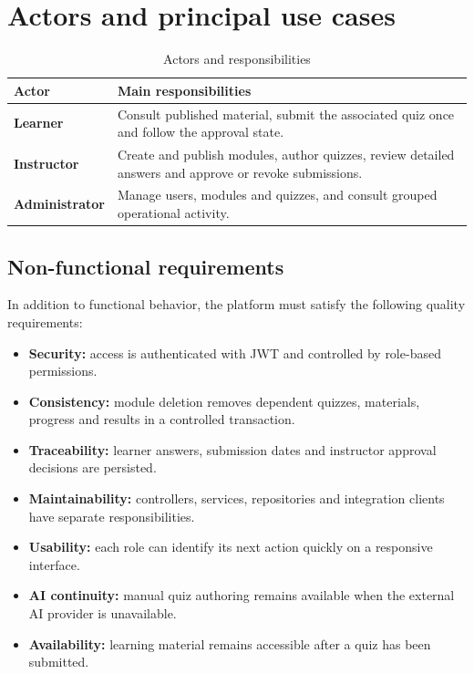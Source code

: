 \section{Actors and principal use cases}
\begin{table}[H]\centering
\caption{Actors and responsibilities}\label{tab:actors}
\begin{tabularx}{\textwidth}{>{\bfseries}p{}X}
\toprule Actor & Main responsibilities\\\midrule
Learner & Consult published material, submit the associated quiz once and follow the approval state.\\
Instructor & Create and publish modules, author quizzes, review detailed answers and approve or revoke submissions.\\
Administrator & Manage users, modules and quizzes, and consult grouped operational activity.\\
\bottomrule
\end{tabularx}
\end{table}

\subsection{Non-functional requirements}
In addition to functional behavior, the platform must satisfy the following
quality requirements:
\begin{itemize}
\item \textbf{Security:} access is authenticated with JWT and controlled by
  role-based permissions.
\item \textbf{Consistency:} module deletion removes dependent quizzes,
  materials, progress and results in a controlled transaction.
\item \textbf{Traceability:} learner answers, submission dates and instructor
  approval decisions are persisted.
\item \textbf{Maintainability:} controllers, services, repositories and
  integration clients have separate responsibilities.
\item \textbf{Usability:} each role can identify its next action quickly on a
  responsive interface.
\item \textbf{AI continuity:} manual quiz authoring remains available when the
  external AI provider is unavailable.
\item \textbf{Availability:} learning material remains accessible after a quiz
  has been submitted.
\end{itemize}

